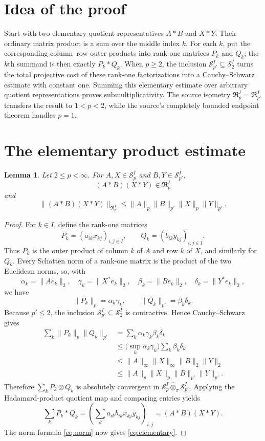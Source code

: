\documentclass[11pt]{article}
\newtheorem{lemma}[theorem]{Lemma}
\newcommand{\Rp}{\mathfrak R}
\newcommand{\Sp}{\mathcal S}
\newcommand{\had}{\mathbin{*}}
\begin{document}
\section{Idea of the proof}

Start with two elementary quotient representatives $A\had B$ and
$X\had Y$.  Their ordinary matrix product is a sum over the middle index
$k$.  For each $k$, put the corresponding column--row outer products into
rank-one matrices $P_k$ and $Q_k$; the $k$th summand is then exactly
$P_k\had Q_k$.  When $p\geq2$, the inclusion
$\Sp_{p'}^I\subseteq\Sp_2^I$ turns the total projective cost of these
rank-one factorizations into a Cauchy--Schwarz estimate with constant one.
Summing this elementary estimate over arbitrary quotient representations
proves submultiplicativity.  The source isometry
$\Rp_p^I=\Rp_{p'}^I$ transfers the result to $1<p<2$, while the source's
completely bounded endpoint theorem handles $p=1$.

\section{The elementary product estimate}

\begin{lemma}\label{lem:elementary}
Let $2\leq p<\infty$.  For $A,X\in\Sp_p^I$ and
$B,Y\in\Sp_{p'}^I$,
\[
 (A\had B)(X\had Y)\in\Rp_p^I
\]
and
\begin{equation}\label{eq:elementary}
 \|(A\had B)(X\had Y)\|_{\Rp_p^I}
 \leq \|A\|_p\|B\|_{p'}\|X\|_p\|Y\|_{p'}.
\end{equation}
\end{lemma}

\begin{proof}
For $k\in I$, define the rank-one matrices
\[
 P_k=(a_{ik}x_{kj})_{i,j\in I},
 \qquad Q_k=(b_{ik}y_{kj})_{i,j\in I}.
\]
Thus $P_k$ is the outer product of column $k$ of $A$ and row $k$ of
$X$, and similarly for $Q_k$.  Every Schatten norm of a rank-one matrix is
the product of the two Euclidean norms, so, with
\[
 \alpha_k=\|Ae_k\|_2,\quad \gamma_k=\|X^*e_k\|_2,
 \quad \beta_k=\|Be_k\|_2,\quad \delta_k=\|Y^*e_k\|_2,
\]
we have
\[
 \|P_k\|_p=\alpha_k\gamma_k,
 \qquad \|Q_k\|_{p'}=\beta_k\delta_k.
\]
Because $p'\leq2$, the inclusion $\Sp_{p'}^I\subseteq\Sp_2^I$ is
contractive.  Hence Cauchy--Schwarz gives
\begin{align*}
 \sum_k\|P_k\|_p\|Q_k\|_{p'}
 &=\sum_k\alpha_k\gamma_k\beta_k\delta_k\\
 &\leq \big(\sup_k\alpha_k\gamma_k\big)
          \sum_k\beta_k\delta_k\\
 &\leq \|A\|_\infty\|X\|_\infty
          \|B\|_2\|Y\|_2\\
 &\leq \|A\|_p\|X\|_p\|B\|_{p'}\|Y\|_{p'}.
\end{align*}
Therefore $\sum_kP_k\otimes Q_k$ is absolutely convergent in
$\Sp_p^I\widehat\otimes_\pi\Sp_{p'}^I$.  Applying the Hadamard-product
quotient map and comparing entries yields
\[
 \sum_kP_k\had Q_k
 =\left(\sum_k a_{ik}b_{ik}x_{kj}y_{kj}\right)_{i,j}
 =(A\had B)(X\had Y).
\]
The norm formula \eqref{eq:norm} now gives \eqref{eq:elementary}.
\end{proof}
\end{document}

